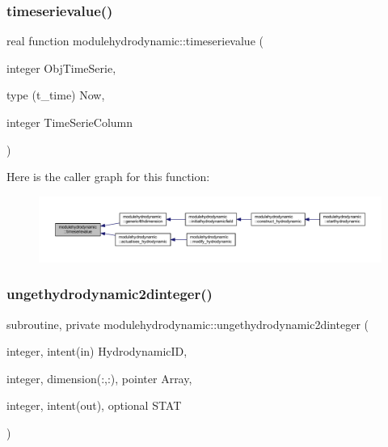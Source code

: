 \subsubsection{\texorpdfstring{timeserievalue()}{timeserievalue()}}
{\footnotesize\ttfamily real function modulehydrodynamic\+::timeserievalue (\begin{DoxyParamCaption}\item[{integer}]{Obj\+Time\+Serie,  }\item[{type (t\+\_\+time)}]{Now,  }\item[{integer}]{Time\+Serie\+Column }\end{DoxyParamCaption})\hspace{0.3cm}{\ttfamily [private]}}

Here is the caller graph for this function\+:\nopagebreak
\begin{figure}[H]
\begin{center}
\leavevmode
\includegraphics[width=350pt]{namespacemodulehydrodynamic_a5ac5205b827b25fab464de95d2c838bf_icgraph}
\end{center}
\end{figure}
\mbox{\label{namespacemodulehydrodynamic_a850463758a40d651e2c1a5de7adb45cc}} 
\subsubsection{\texorpdfstring{ungethydrodynamic2dinteger()}{ungethydrodynamic2dinteger()}}
{\footnotesize\ttfamily subroutine, private modulehydrodynamic\+::ungethydrodynamic2dinteger (\begin{DoxyParamCaption}\item[{integer, intent(in)}]{Hydrodynamic\+ID,  }\item[{integer, dimension(\+:,\+:), pointer}]{Array,  }\item[{integer, intent(out), optional}]{S\+T\+AT }\end{DoxyParamCaption})\hspace{0.3cm}{\ttfamily [private]}}

